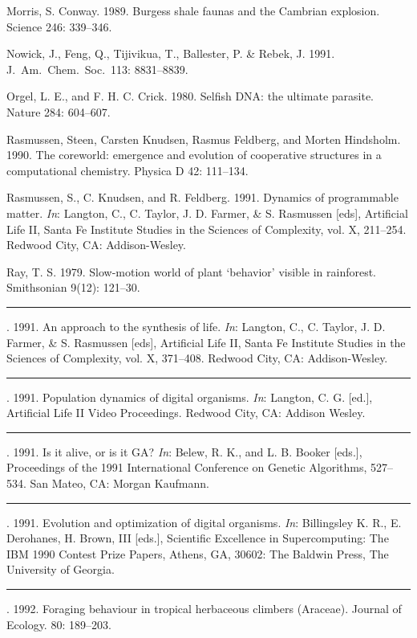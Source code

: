 \begin{thebibliography}{99}
Morris, S. Conway.  1989.  Burgess shale faunas and the Cambrian explosion.
Science 246: 339--346.

Nowick, J., Feng, Q., Tijivikua, T., Ballester, P. \& Rebek, J.  1991.
J.\ Am.\ Chem.\ Soc.\ 113: 8831--8839.

Orgel, L. E., and F. H. C. Crick.  1980.  Selfish DNA: the ultimate parasite.
Nature 284: 604--607.

Rasmussen, Steen, Carsten Knudsen, Rasmus Feldberg, and Morten Hindsholm.
1990.  The coreworld: emergence and evolution of cooperative structures
in a computational chemistry.  Physica D 42: 111--134.

Rasmussen, S., C. Knudsen, and R. Feldberg.  1991.  Dynamics of programmable
matter.  {\em In\/}: Langton, C., C. Taylor, J. D. Farmer, \& S.
Rasmussen [eds], Artificial Life II, Santa Fe Institute Studies in the
Sciences of Complexity, vol. X, 211--254.  Redwood City, CA: Addison-Wesley.

Ray, T. S.  1979.  Slow-motion world of plant `behavior' visible
in rainforest.  Smithsonian 9(12): 121--30.

\rule[0pt]{3em}{.4pt}.  1991.  An approach to the synthesis of life.
{\em In\/}: Langton, C., C. Taylor, J. D. Farmer, \& S. Rasmussen [eds],
Artificial Life II, Santa Fe Institute Studies in the Sciences of
Complexity, vol. X, 371--408.  Redwood City, CA: Addison-Wesley.

\rule[0pt]{3em}{.4pt}.  1991.  Population dynamics of digital organisms.
{\em In\/}: Langton, C. G. [ed.], Artificial Life II Video Proceedings.
Redwood City, CA: Addison Wesley.

\rule[0pt]{3em}{.4pt}.  1991.  Is it alive, or is it GA?
{\em In\/}: Belew, R. K., and L. B. Booker [eds.], Proceedings of the 1991
International Conference on Genetic Algorithms, 527--534.  San Mateo, CA:
Morgan Kaufmann.

\rule[0pt]{3em}{.4pt}.  1991.  Evolution and optimization of digital
organisms.  {\em In\/}: Billingsley K. R., E. Derohanes, H. Brown, III [eds.],
Scientific Excellence in Supercomputing: The IBM 1990 Contest Prize Papers,
Athens, GA, 30602: The Baldwin Press, The University of Georgia.

\rule[0pt]{3em}{.4pt}.  1992.  Foraging behaviour in tropical herbaceous
climbers (Araceae).  Journal of Ecology.  80: 189--203.


\end{thebibliography}
